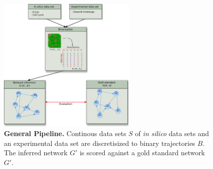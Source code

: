 \begin{figure}[H]
\centering

\includegraphics[width=0.6\textwidth]{./Bilder/IntroductionPipeline2.pdf}
\caption[General Pipeline]{\textbf{General Pipeline.} Continous data sets $S$ of \textit{in silico} data sets and an experimental data set are discretisized to binary trajectories $B$. The inferred network $G'$ is scored against a gold standard network $G'$. }
\label{fig:General Pipeline}
\end{figure} 



